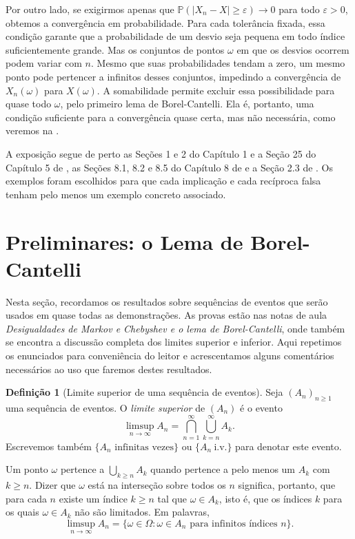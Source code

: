 \documentclass[12pt,portuguese]{article}
\theoremstyle{definition}
\newtheorem{definition}[definition]{Definição}
\theoremstyle{plainexercise}
\theoremstyle{starredexercise}
\theoremstyle{definition}
\begin{document}
Por outro lado, se exigirmos apenas que
$\mathbb{P}(|X_n-X|\geqslant\varepsilon)\to0$ para todo $\varepsilon>0$,
obtemos a convergência em probabilidade. Para cada tolerância fixada, essa
condição garante que a probabilidade de um desvio seja pequena em todo índice
suficientemente grande. Mas os conjuntos de pontos $\omega$ em que os desvios
ocorrem podem variar com $n$. Mesmo que suas probabilidades tendam a zero, um
mesmo ponto pode pertencer a infinitos desses conjuntos, impedindo a
convergência de $X_n(\omega)$ para $X(\omega)$. A somabilidade permite excluir
essa possibilidade para quase todo $\omega$, pelo primeiro lema de
Borel-Cantelli. Ela é, portanto, uma condição suficiente para a convergência
quase certa, mas não necessária, como veremos na
.

A exposição segue de perto as Seções 1 e 2 do Capítulo 1 e a Seção 25 do
Capítulo 5 de \cite{MR2893652}, as Seções 8.1, 8.2 e 8.5 do Capítulo 8 de
\cite{GrimmettWelsh2014} e a Seção 2.3 de \cite{MR3930614}. Os exemplos foram
escolhidos para que cada implicação e cada recíproca falsa tenham pelo menos um
exemplo concreto associado.

\section{Preliminares: o Lema de Borel-Cantelli}\label{sec:preliminares}

Nesta seção, recordamos os resultados sobre sequências de eventos que serão
usados em quase todas as demonstrações. As provas estão nas notas de aula
\emph{Desigualdades de Markov e Chebyshev e o lema de Borel-Cantelli}, onde
também se encontra a discussão completa dos limites superior e inferior. Aqui
repetimos os enunciados para conveniência do leitor e
acrescentamos alguns comentários necessários ao uso que faremos destes resultados.

\begin{definition}[Limite superior de uma sequência de eventos]\label{def:limsup}
Seja $(A_n)_{n\geqslant1}$ uma sequência de eventos. O \emph{limite superior}
de $(A_n)$ é o evento
\[
\limsup_{n\to\infty}A_n
=
\bigcap_{n=1}^{\infty}\bigcup_{k=n}^{\infty}A_k.
\]
Escrevemos também $\{A_n\text{ infinitas vezes}\}$ ou $\{A_n\ \text{i.v.}\}$
para denotar este evento.
\end{definition}

Um ponto $\omega$ pertence a $\bigcup_{k\geqslant n}A_k$ quando pertence a pelo
menos um $A_k$ com $k\geqslant n$. Dizer que $\omega$ está na interseção sobre
todos os $n$ significa, portanto, que para cada $n$ existe um índice
$k\geqslant n$ tal que $\omega\in A_k$, isto é, que os índices $k$ para os quais
$\omega\in A_k$ não são limitados. Em palavras,
\[
\limsup_{n\to\infty}A_n
=
\{\omega\in\Omega:\omega\in A_n\text{ para infinitos índices }n\}.
\]
\end{document}
